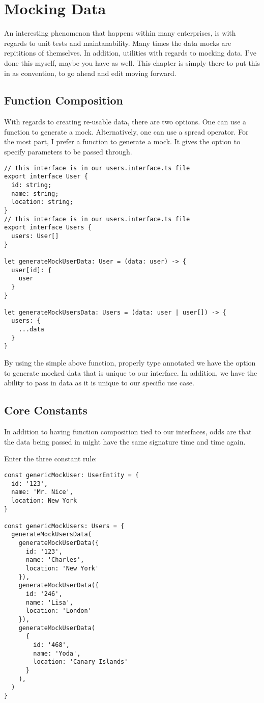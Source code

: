 \maketitle{}
\section{ Mocking Data }
An interesting phenomenon that happens within many enterprises, is with regards
to unit tests and maintanability. Many times the data mocks are repititions of
themselves. In addition, utilities with regards to mocking data. I've done this
myself, maybe you have as well. This chapter is simply there to put this in as
convention, to go ahead and edit moving forward.

\subsection{ Function Composition }
With regards to creating re-usable data, there are two options. One can use a
function to generate a mock. Alternatively, one can use a spread operator. For
the most part, I prefer a function to generate a mock. It gives the option to
specify parameters to be passed through.

\begin{lstlisting}
// this interface is in our users.interface.ts file
export interface User {
  id: string;
  name: string;
  location: string;
}
// this interface is in our users.interface.ts file
export interface Users {
  users: User[]
}

let generateMockUserData: User = (data: user) -> {
  user[id]: {
    user
  }
}

let generateMockUsersData: Users = (data: user | user[]) -> {
  users: {
    ...data
  }
}
\end{lstlisting}

By using the simple above function, properly type annotated we have the option
to generate mocked data that is unique to our interface. In addition, we have
the ability to pass in data as it is unique to our specific use case.

\subsection{ Core Constants }
In addition to having function composition tied to our interfaces, odds are that
the data being passed in might have the same signature time and time again.

Enter the three constant rule:

\begin{lstlisting}
const genericMockUser: UserEntity = {
  id: '123',
  name: 'Mr. Nice',
  location: New York
}

const genericMockUsers: Users = {
  generateMockUsersData(
    generateMockUserData({
      id: '123',
      name: 'Charles',
      location: 'New York'
    }),
    generateMockUserData({
      id: '246',
      name: 'Lisa',
      location: 'London'
    }),
    generateMockUserData(
      {
        id: '468',
        name: 'Yoda',
        location: 'Canary Islands'
      }
    ),
  )
}
\end{lstlisting}
